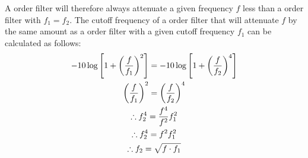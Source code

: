 \noindent A  order filter will therefore always attenuate a given frequency $f$ less than a  order filter with $f_1 = f_2$.
The cutoff frequency of a  order filter that will attenuate $f$ by the same amount as a  order filter with a given cutoff frequency $f_1$
can be calculated as follows:
\begin{gather}
    -10\log\left[1 + \left(\frac{f}{f_{1}}\right)^{2}\right] = -10\log \left[1+\left(\frac{f}{f_2}\right)^4\right]          \notag\\
    \left( \frac{f}{f_1} \right)^2 = \left( \frac{f}{f_2} \right)^4                                                         \notag\\
    \therefore f_2^4 = \frac{f^4}{f^2} f_1^2                                                                                \notag\\
    \therefore f_2^4 = f^2 f_1^2                                                                                            \notag\\
    \therefore f_2 = \sqrt{f \cdot f_1}                                                                                     \label{eqn:1st2nd_cutoff_atten}
\end{gather}